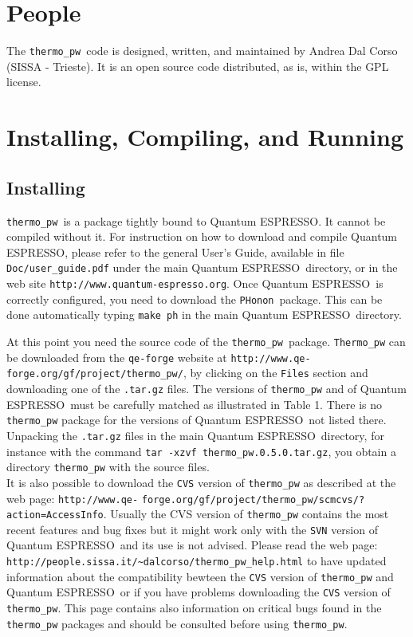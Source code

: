 \documentclass[12pt,a4paper]{article}
\def\qe{{\sc Quantum ESPRESSO}}
\def\PHonon{\texttt{PHonon}}
\def\thermo{\texttt{thermo\_pw}}
\begin{document}
\section{\color{coral}People}
The \thermo\ code is designed, written, and maintained by Andrea Dal Corso 
(SISSA - Trieste). It is an open source code distributed, as is, within the GPL
license.  

\section{\color{coral}Installing, Compiling, and Running}

\subsection{\color{web-blue}Installing}

\thermo\ is a package tightly bound to \qe. It cannot be compiled without
it. For instruction on how to download and compile \qe, please 
refer to the general User's Guide, available in file \texttt{Doc/user\_guide.pdf}
under the main \qe\ directory, or in the web site 
\texttt{http://www.quantum-espresso.org}.
Once \qe\ is correctly configured, you need to download the \PHonon\ 
package. This can be done automatically typing \texttt{make ph} in
the main \qe\ directory.

At this point you need the source code of the \thermo\ package. 
\texttt{Thermo\_pw} can be downloaded from the 
\texttt{qe-forge} website at \texttt{http://www.qe-} 
\texttt{forge.org/gf/project/thermo\_pw/}, by clicking on the \texttt{Files}
section and downloading one of the \texttt{.tar.gz} files.
The versions of \texttt{thermo\_pw} and of \qe\ must be carefully matched
as illustrated in Table 1. 
There is no \texttt{thermo\_pw} package for the versions of \qe\ not listed 
there. Unpacking the \texttt{.tar.gz} files in the main \qe\ directory, for
instance with the command \texttt{tar -xzvf thermo\_pw.0.5.0.tar.gz}, you
obtain a directory \texttt{thermo\_pw} with the source files. \\
It is also possible to download the \texttt{CVS} version of 
\texttt{thermo\_pw} as described at
the web page: \texttt{http://www.qe-} \texttt{forge.org/gf/project/thermo\_pw/scmcvs/?action=AccessInfo}.
Usually the CVS version of \texttt{thermo\_pw} contains the most recent
features and bug fixes but it might work only with the \texttt{SVN} 
version of \qe\ and its use is not advised.
Please read the web page: 
\texttt{http://people.sissa.it/\textasciitilde dalcorso/thermo\_pw\_help.html} 
to have updated information about the compatibility bewteen the \texttt{CVS} 
version of \texttt{thermo\_pw} and \qe\ or if you have problems downloading
the \texttt{CVS} version of \texttt{thermo\_pw}.
This page contains also information on critical bugs found in the 
\texttt{thermo\_pw} packages and should be consulted before using 
\texttt{thermo\_pw}.
\end{document}
